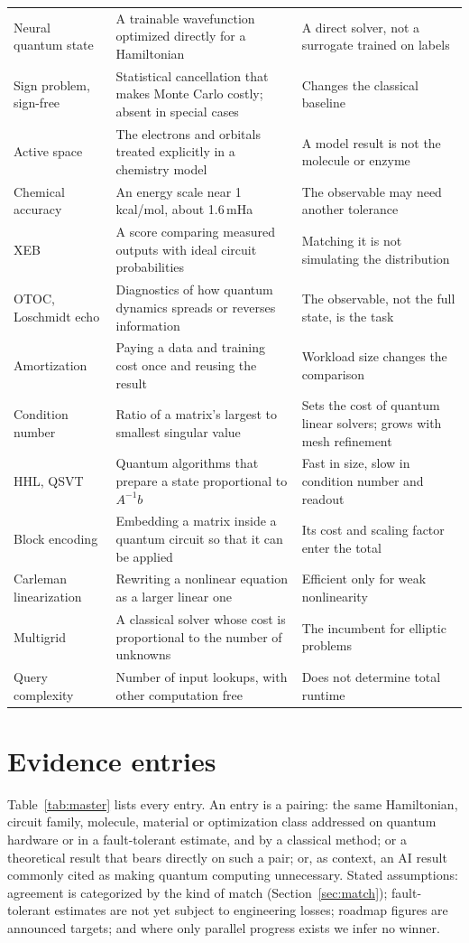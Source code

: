 \documentclass[10pt,a4paper]{article}
\begin{document}
{\begin{longtable}{@{}L{3.4cm} L{7.1cm} L{5.2cm}@{}}
Neural quantum state & A trainable wavefunction optimized directly for a Hamiltonian & A direct solver, not a surrogate trained on labels\\
Sign problem, sign-free & Statistical cancellation that makes Monte Carlo costly; absent in special cases & Changes the classical baseline\\
Active space & The electrons and orbitals treated explicitly in a chemistry model & A model result is not the molecule or enzyme\\
Chemical accuracy & An energy scale near 1\,kcal/mol, about 1.6\,mHa & The observable may need another tolerance\\
XEB & A score comparing measured outputs with ideal circuit probabilities & Matching it is not simulating the distribution\\
OTOC, Loschmidt echo & Diagnostics of how quantum dynamics spreads or reverses information & The observable, not the full state, is the task\\
Amortization & Paying a data and training cost once and reusing the result & Workload size changes the comparison\\
Condition number & Ratio of a matrix's largest to smallest singular value & Sets the cost of quantum linear solvers; grows with mesh refinement\\
HHL, QSVT & Quantum algorithms that prepare a state proportional to $A^{-1}b$ & Fast in size, slow in condition number and readout\\
Block encoding & Embedding a matrix inside a quantum circuit so that it can be applied & Its cost and scaling factor enter the total\\
Carleman linearization & Rewriting a nonlinear equation as a larger linear one & Efficient only for weak nonlinearity\\
Multigrid & A classical solver whose cost is proportional to the number of unknowns & The incumbent for elliptic problems\\
Query complexity & Number of input lookups, with other computation free & Does not determine total runtime\\
\end{longtable}
}

\section{Evidence entries}
\label{app:entries}
Table~\ref{tab:master} lists every entry. An entry is a pairing: the same Hamiltonian, circuit family, molecule, material or optimization class addressed on quantum hardware or in a fault-tolerant estimate, and by a classical method; or a theoretical result that bears directly on such a pair; or, as context, an AI result commonly cited as making quantum computing unnecessary. Stated assumptions: agreement is categorized by the kind of match (Section~\ref{sec:match}); fault-tolerant estimates are not yet subject to engineering losses; roadmap figures are announced targets; and where only parallel progress exists we infer no winner.
\end{document}

